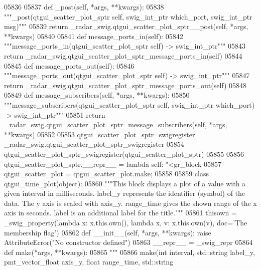 \begin{DoxyCode}
{{{{{{{{{{{{{{{{{{{05836 
05837     \textcolor{keyword}{def }_post(self, *args, **kwargs):
05838         \textcolor{stringliteral}{"""\_post(qtgui\_scatter\_plot\_sptr self, swig\_int\_ptr which\_port, swig\_int\_ptr msg)"""}
05839         \textcolor{keywordflow}{return} \_radar\_swig.qtgui\_scatter\_plot\_sptr\_\_post(self, *args, **kwargs)
05840 
05841     \textcolor{keyword}{def }message_ports_in(self):
05842         \textcolor{stringliteral}{"""message\_ports\_in(qtgui\_scatter\_plot\_sptr self) -> swig\_int\_ptr"""}
05843         \textcolor{keywordflow}{return} \_radar\_swig.qtgui\_scatter\_plot\_sptr\_message\_ports\_in(self)
05844 
05845     \textcolor{keyword}{def }message_ports_out(self):
05846         \textcolor{stringliteral}{"""message\_ports\_out(qtgui\_scatter\_plot\_sptr self) -> swig\_int\_ptr"""}
05847         \textcolor{keywordflow}{return} \_radar\_swig.qtgui\_scatter\_plot\_sptr\_message\_ports\_out(self)
05848 
05849     \textcolor{keyword}{def }message_subscribers(self, *args, **kwargs):
05850         \textcolor{stringliteral}{"""message\_subscribers(qtgui\_scatter\_plot\_sptr self, swig\_int\_ptr which\_port) -> swig\_int\_ptr"""}
05851         \textcolor{keywordflow}{return} \_radar\_swig.qtgui\_scatter\_plot\_sptr\_message\_subscribers(self, *args, **kwargs)
05852 
05853 qtgui\_scatter\_plot\_sptr\_swigregister = \_radar\_swig.qtgui\_scatter\_plot\_sptr\_swigregister
05854 qtgui_scatter_plot_sptr_swigregister(qtgui\_scatter\_plot\_sptr)
05855 
05856 qtgui\_scatter\_plot\_sptr.\_\_repr\_\_ = \textcolor{keyword}{lambda} self: \textcolor{stringliteral}{"<gr\_block %
05857 qtgui\_scatter\_plot = qtgui\_scatter\_plot.make;
05858 
05859 \textcolor{keyword}{class }qtgui_time_plot(object):
05860     \textcolor{stringliteral}{"""This block displays a plot of a value with a given interval in milliseconds. label\_y represents the
       identifier (symbol) of the data. The y axis is scaled with axis\_y. range\_time gives the shown range of the x
       axis in seconds. label is an additional label for the title."""}
05861     thisown = _swig_property(\textcolor{keyword}{lambda} x: x.this.own(), \textcolor{keyword}{lambda} x, v: x.this.own(v), doc=\textcolor{stringliteral}{'The membership flag'})
05862     \textcolor{keyword}{def }__init__(self, *args, **kwargs): \textcolor{keywordflow}{raise} AttributeError(\textcolor{stringliteral}{"No constructor defined"})
05863     \_\_repr\_\_ = \_swig\_repr
05864     \textcolor{keyword}{def }make(*args, **kwargs):
05865         \textcolor{stringliteral}{"""}
05866 \textcolor{stringliteral}{        make(int interval, std::string label\_y, pmt\_vector\_float axis\_y, float range\_time, std::string
}}}}}}}}}}}}}}}}}}}}}
\end{DoxyCode}
